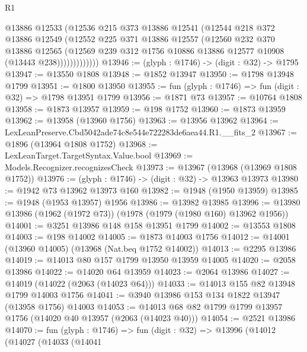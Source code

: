 \begin{lexlean}{R1}
\begin{coremodule}
                  @13886
                  @12533
                  (@12536
                    @215
                    @373
                    @13886
                    @12541
                    (@12544
                      @218
                      @372
                      @13886
                      @12549
                      (@12552
                        @225
                        @371
                        @13886
                        @12557
                        (@12560
                          @232
                          @370
                          @13886
                          @12565
                          (@12569
                            @239
                            @312
                            @1756
                            @10886
                            @13886
                            @12577
                            @10908
                            (@13443 @238)))))))))))))
@13946 := (glyph : @1746) -> (digit : @32) -> @1795
@13947 := @13550 @1808
@13948 := @1852 @13947
@13950 := @1798 @13948 @1799
@13951 := @1800 @13950
@13955 := fun (glyph : @1746) => fun (digit : @32) => @1798 @13951 @1799
@13956 := @1871 @73
@13957 := @10764 @1808
@13958 := @1873 @13957
@13959 := @198 @1752
@13960 := @1873 @13959
@13962 := @13958 (@13960 @1756)
@13963 := @13956 @13962
@13964 := LexLeanPreserve.Cbd5042ade74c8e544e722283de6aea44.R1.__fits_2
@13967 := @1896 (@13964 @1808 @1752)
@13968 := LexLeanTarget.TargetSyntax.Value.bool
@13969 := Models.Recognizer.recognizesCheck
@13973 := @13967 (@13968 (@13969 @1808 @1752))
@13976 := (glyph : @1746) -> (digit : @32) -> @13963 @13973
@13980 := @1942 @73 @13962 @13973 @160
@13982 := @1948 (@1950 @13959)
@13985 := @1948 (@1953 @13957) @1956
@13986 := @13982 @13985
@13996 := @13980 @13986 (@1962 (@1972 @73)) (@1978 (@1979 (@1980 @160) @13962 @1956))
@14001 := @3251 @13986 @148 @158 @13951 @1799
@14002 := @13553 @1808
@14003 := @198 @14002
@14005 := @1873 @14003 @1756
@14012 := @14001 (@13960 @14005) (@13968 (Nat.beq @1752 @14002))
@14013 := @2295 @13986
@14019 := @14013 @80 @157 @1799 @13950 @13959 @14005
@14020 := @2058 @13986
@14022 := @14020 @64 @13959
@14023 := @2064 @13986
@14027 := @14019 (@14022 (@2063 (@14023 @64)))
@14033 := @14013 @155 @82 @13948 @1799 @14003 @1756
@14041 := @3940 @13986 @153 @134 @1822 @13947 (@13958 @1756) @14003
@14053 := @14013 @68 @82 @1799 @1799 @13957 @1756 (@14020 @40 @13957 (@2063 (@14023 @40)))
@14054 := @2521 @13986
@14070 := fun (glyph : @1746) =>
  fun (digit : @32) =>
  @13996
    (@14012
      (@14027
        (@14033
          (@14041

\end{coremodule}
\end{lexlean}
